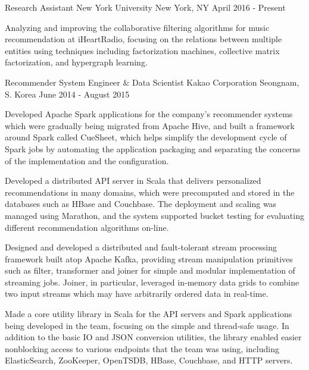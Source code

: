 \documentclass[12pt, a4paper]{awesome-cv}
\begin{document}
	\makecvheader
	
	\begin{cventries}
		\cventry
		{Research Assistant}
		{New York University}
		{New York, NY}
		{April 2016 - Present}
		{
			\begin{cvitems}
				\item Analyzing and improving the collaborative filtering algorithms for music recommendation at iHeartRadio, focusing on the relations between multiple entities using techniques including factorization machines, collective matrix factorization, and hypergraph learning.
			\end{cvitems}
		}
		\cventry
		{Recommender System Engineer \& Data Scientist}
		{Kakao Corporation}
		{Seongnam, S. Korea}
		{June 2014 - August 2015}
		{
			\begin{cvitems}
				\item Developed Apache Spark applications for the company's recommender systems which were gradually being migrated from Apache Hive, and built a framework around Spark called CueSheet, which helps simplify the development cycle of Spark jobs by automating the application packaging and separating the concerns of the implementation and the configuration.
				\item Developed a distributed API server in Scala that delivers personalized recommendations in many domains, which were precomputed and stored in the databases such as HBase and Couchbase. The deployment and scaling was managed using Marathon, and the system supported bucket testing for evaluating different recommendation algorithms on-line.
				\item Designed and developed a distributed and fault-tolerant stream processing framework built atop Apache Kafka, providing stream manipulation primitives such as filter, transformer and joiner for simple and modular implementation of streaming jobs. Joiner, in particular, leveraged in-memory data grids to combine two input streams which may have arbitrarily ordered data  in real-time.
				\item Made a core utility library in Scala for the API servers and Spark applications being developed in the team, focusing on the simple and thread-safe usage. In addition to the basic IO and JSON conversion utilities, the library enabled easier nonblocking access to various endpoints that the team was using, including ElasticSearch, ZooKeeper, OpenTSDB, HBase, Couchbase, and HTTP servers.

\end{cvitems}}
\end{cventries}
\end{document}
